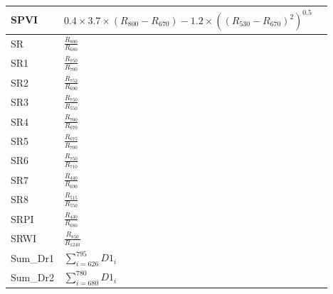 \documentclass[letterpaper, peerreview, draftcls]{IEEEtran}
\begin{document}
\begin{xtabular*}{0.3\textwidth}{lll}
	\midrule
	SPVI           & \parbox{3.8cm}{$0.4 \times 3.7 \times (R_{800}-R_{670})-1.2 \times ((R_{530}-R_{670})^2)^{0.5}$}     & \cite{vincini2006} \\
	\midrule
	SR             & $\frac{R_{800}}{R_{680}}$                                                                            & \cite{jordan1969} \\
	SR1            & $\frac{R_{750}}{R_{700}}$                                                                            & \cite{gitelson1997}\\
	SR2            & $\frac{R_{752}}{R_{690}}$                                                                            & \cite{gitelson1997}\\
	SR3            & $\frac{R_{750}}{R_{550}}$                                                                            & \cite{gitelson1997}\\
	SR4            & $\frac{R_{700}}{R_{670}}$                                                                            & \cite{mcmurtrey1994} \\
	SR5            & $\frac{R_{675}}{R_{700}}$                                                                            & \cite{chappelle1992} \\
	SR6            & $\frac{R_{750}}{R_{710}}$                                                                            & \cite{zarco-tejada1999} \\
	SR7            & $\frac{R_{440}}{R_{690}}$                                                                            & \cite{lichtenthaler1996} \\
	SR8            & $\frac{R_{515}}{R_{550}}$                                                                            & \cite{hernandez-clemente2012}\\
	SRPI           & $\frac{R_{430}}{R_{680}}$                                                                            & \cite{pen-uelas1995}\\
	SRWI           & $\frac{R_{850}}{R_{1240}}$                                                                           & \cite{zarco-tejada2003a}\\
	Sum\_Dr1       & $\sum_{i=626}^{795} D1_i$                                                                            & \cite{elvidge1995} \\
	Sum\_Dr2       & $\sum_{i=680}^{780} D1_i$                                                                            & \cite{filella1994} \\

\end{xtabular*}
\end{document}
